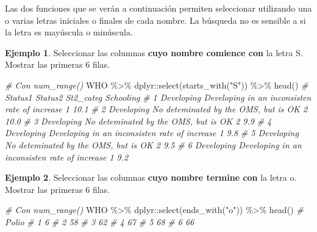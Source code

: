 \documentclass[
]{article}
\newenvironment{Shaded}{\begin{snugshade}}{\end{snugshade}}
\newcommand{\CommentTok}[1]{\textcolor[rgb]{0.56,0.35,0.01}{\textit{#1}}}
\newcommand{\FunctionTok}[1]{\textcolor[rgb]{0.00,0.00,0.00}{#1}}
\newcommand{\NormalTok}[1]{#1}
\newcommand{\SpecialCharTok}[1]{\textcolor[rgb]{0.00,0.00,0.00}{#1}}
\newcommand{\StringTok}[1]{\textcolor[rgb]{0.31,0.60,0.02}{#1}}
\theoremstyle{definition}
\theoremstyle{definition}
\newtheorem{example}{Ejemplo}[section]
\theoremstyle{definition}
\theoremstyle{definition}
\theoremstyle{remark}
\begin{document}
\begin{rmdnote}
Las dos funciones que se verán a continuación permiten seleccionar utilizando una o varias letras iniciales o finales de cada nombre. La búsqueda no es sensible a si la letra es mayúscula o minúscula.
\end{rmdnote}

\begin{example}

Seleccionar las columnas \textbf{cuyo nombre comience con} la letra S. Mostrar las primeras 6 filas.

\begin{Shaded}
\begin{Highlighting}[]
\CommentTok{\# Con num\_range()}
\NormalTok{WHO }\SpecialCharTok{\%\textgreater{}\%} 
\NormalTok{  dplyr}\SpecialCharTok{::}\FunctionTok{select}\NormalTok{(}\FunctionTok{starts\_with}\NormalTok{(}\StringTok{"S"}\NormalTok{)) }\SpecialCharTok{\%\textgreater{}\%} 
  \FunctionTok{head}\NormalTok{()}
\CommentTok{\#      Status1                                       Status2 St2\_categ Schooling}
\CommentTok{\# 1 Developing Developing in an inconsisten rate of increase         1      10.1}
\CommentTok{\# 2 Developing          No deteminated by the OMS, but is OK         2      10.0}
\CommentTok{\# 3 Developing          No deteminated by the OMS, but is OK         2       9.9}
\CommentTok{\# 4 Developing Developing in an inconsisten rate of increase         1       9.8}
\CommentTok{\# 5 Developing          No deteminated by the OMS, but is OK         2       9.5}
\CommentTok{\# 6 Developing Developing in an inconsisten rate of increase         1       9.2}
\end{Highlighting}
\end{Shaded}

\end{example}

\begin{example}

Seleccionar las columnas \textbf{cuyo nombre termine con} la letra o. Mostrar las primeras 6 filas.

\begin{Shaded}
\begin{Highlighting}[]
\CommentTok{\# Con num\_range()}
\NormalTok{WHO }\SpecialCharTok{\%\textgreater{}\%} 
\NormalTok{  dplyr}\SpecialCharTok{::}\FunctionTok{select}\NormalTok{(}\FunctionTok{ends\_with}\NormalTok{(}\StringTok{"o"}\NormalTok{)) }\SpecialCharTok{\%\textgreater{}\%} 
  \FunctionTok{head}\NormalTok{()}
\CommentTok{\#   Polio}
\CommentTok{\# 1     6}
\CommentTok{\# 2    58}
\CommentTok{\# 3    62}
\CommentTok{\# 4    67}
\CommentTok{\# 5    68}
\CommentTok{\# 6    66}
\end{Highlighting}
\end{Shaded}

\end{example}
\end{document}
